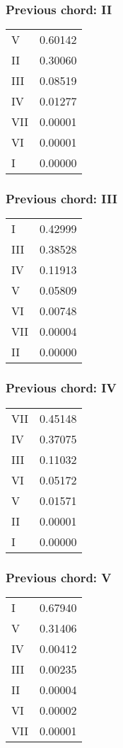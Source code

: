 \subsubsection*{Previous chord: II}


\begin{tabular}{l l}
V & 0.60142 \\
II & 0.30060 \\
III & 0.08519 \\
IV & 0.01277 \\
VII & 0.00001 \\
VI & 0.00001 \\
I & 0.00000 \\
\end{tabular}


\subsubsection*{Previous chord: III}


\begin{tabular}{l l}
I & 0.42999 \\
III & 0.38528 \\
IV & 0.11913 \\
V & 0.05809 \\
VI & 0.00748 \\
VII & 0.00004 \\
II & 0.00000 \\
\end{tabular}


\subsubsection*{Previous chord: IV}


\begin{tabular}{l l}
VII & 0.45148 \\
IV & 0.37075 \\
III & 0.11032 \\
VI & 0.05172 \\
V & 0.01571 \\
II & 0.00001 \\
I & 0.00000 \\
\end{tabular}


\subsubsection*{Previous chord: V}


\begin{tabular}{l l}
I & 0.67940 \\
V & 0.31406 \\
IV & 0.00412 \\
III & 0.00235 \\
II & 0.00004 \\
VI & 0.00002 \\
VII & 0.00001 \\
\end{tabular}


